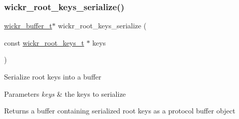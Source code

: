 \subsubsection{\texorpdfstring{wickr\+\_\+root\+\_\+keys\+\_\+serialize()}{wickr\_root\_keys\_serialize()}}
{\footnotesize\ttfamily \mbox{\hyperlink{structwickr__buffer}{wickr\+\_\+buffer\+\_\+t}}$\ast$ wickr\+\_\+root\+\_\+keys\+\_\+serialize (\begin{DoxyParamCaption}\item[{const \mbox{\hyperlink{structwickr__root__keys}{wickr\+\_\+root\+\_\+keys\+\_\+t}} $\ast$}]{keys }\end{DoxyParamCaption})}

Serialize root keys into a buffer


\begin{DoxyParams}{Parameters}
{\em keys} & the keys to serialize \\
\hline
\end{DoxyParams}
\begin{DoxyReturn}{Returns}
a buffer containing serialized root keys as a protocol buffer object 
\end{DoxyReturn}
